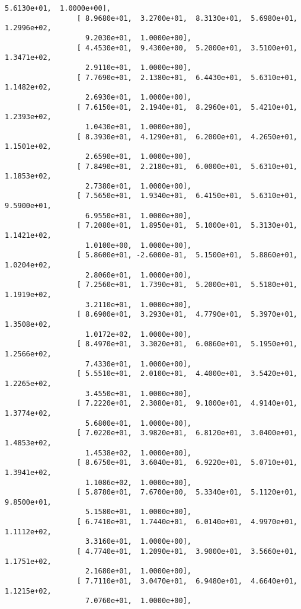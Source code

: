 \documentclass[11pt]{article}
\begin{document}
\begin{Verbatim}[commandchars=\\\{\}]
                   5.6130e+01,  1.0000e+00],
                 [ 8.9680e+01,  3.2700e+01,  8.3130e+01,  5.6980e+01,  1.2996e+02,
                   9.2030e+01,  1.0000e+00],
                 [ 4.4530e+01,  9.4300e+00,  5.2000e+01,  3.5100e+01,  1.3471e+02,
                   2.9110e+01,  1.0000e+00],
                 [ 7.7690e+01,  2.1380e+01,  6.4430e+01,  5.6310e+01,  1.1482e+02,
                   2.6930e+01,  1.0000e+00],
                 [ 7.6150e+01,  2.1940e+01,  8.2960e+01,  5.4210e+01,  1.2393e+02,
                   1.0430e+01,  1.0000e+00],
                 [ 8.3930e+01,  4.1290e+01,  6.2000e+01,  4.2650e+01,  1.1501e+02,
                   2.6590e+01,  1.0000e+00],
                 [ 7.8490e+01,  2.2180e+01,  6.0000e+01,  5.6310e+01,  1.1853e+02,
                   2.7380e+01,  1.0000e+00],
                 [ 7.5650e+01,  1.9340e+01,  6.4150e+01,  5.6310e+01,  9.5900e+01,
                   6.9550e+01,  1.0000e+00],
                 [ 7.2080e+01,  1.8950e+01,  5.1000e+01,  5.3130e+01,  1.1421e+02,
                   1.0100e+00,  1.0000e+00],
                 [ 5.8600e+01, -2.6000e-01,  5.1500e+01,  5.8860e+01,  1.0204e+02,
                   2.8060e+01,  1.0000e+00],
                 [ 7.2560e+01,  1.7390e+01,  5.2000e+01,  5.5180e+01,  1.1919e+02,
                   3.2110e+01,  1.0000e+00],
                 [ 8.6900e+01,  3.2930e+01,  4.7790e+01,  5.3970e+01,  1.3508e+02,
                   1.0172e+02,  1.0000e+00],
                 [ 8.4970e+01,  3.3020e+01,  6.0860e+01,  5.1950e+01,  1.2566e+02,
                   7.4330e+01,  1.0000e+00],
                 [ 5.5510e+01,  2.0100e+01,  4.4000e+01,  3.5420e+01,  1.2265e+02,
                   3.4550e+01,  1.0000e+00],
                 [ 7.2220e+01,  2.3080e+01,  9.1000e+01,  4.9140e+01,  1.3774e+02,
                   5.6800e+01,  1.0000e+00],
                 [ 7.0220e+01,  3.9820e+01,  6.8120e+01,  3.0400e+01,  1.4853e+02,
                   1.4538e+02,  1.0000e+00],
                 [ 8.6750e+01,  3.6040e+01,  6.9220e+01,  5.0710e+01,  1.3941e+02,
                   1.1086e+02,  1.0000e+00],
                 [ 5.8780e+01,  7.6700e+00,  5.3340e+01,  5.1120e+01,  9.8500e+01,
                   5.1580e+01,  1.0000e+00],
                 [ 6.7410e+01,  1.7440e+01,  6.0140e+01,  4.9970e+01,  1.1112e+02,
                   3.3160e+01,  1.0000e+00],
                 [ 4.7740e+01,  1.2090e+01,  3.9000e+01,  3.5660e+01,  1.1751e+02,
                   2.1680e+01,  1.0000e+00],
                 [ 7.7110e+01,  3.0470e+01,  6.9480e+01,  4.6640e+01,  1.1215e+02,
                   7.0760e+01,  1.0000e+00],

\end{Verbatim}
\end{document}
